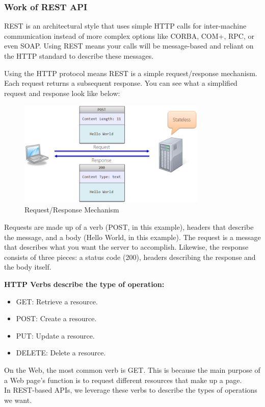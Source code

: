 \subsubsection{Work of REST API}
\hspace{2cm}REST is an architectural style that uses simple HTTP calls for inter-machine communication instead of more complex options like CORBA, COM+, RPC, or even SOAP. Using REST means your calls will be message-based and reliant on the HTTP standard to describe these messages.

Using the HTTP protocol means REST is a simple request/response mechanism. Each request returns a subsequent response. You can see what a simplified request and response look like below:
\newpage
\begin{figure}[htp]%
    \center%
    \includegraphics[width=0.8\textwidth]{images/ch4/REST-01.png}%
    \caption[Request/Response Mechanism]{Request/Response Mechanism}\label{fig: Request/Response Mechanism}%
  \end{figure}
  \newline
Requests are made up of a verb (POST, in this example), headers that describe the message, and a body (Hello World,  in this example). The request is a message that describes what you want the server to accomplish. Likewise, the response consists of three pieces: a status code (200), headers describing the response and the body itself.\newline

\textbf{HTTP Verbs describe the type of operation:}
\begin{itemize}
    \item GET: Retrieve a resource.
    \item POST: Create a resource.
    \item PUT: Update a resource.
    \item DELETE: Delete a resource.
\end{itemize}
On the Web, the most common verb is GET. This is because the main purpose of a Web page's function is to request different resources that make up a page.\\
In REST-based APIs, we leverage these verbs to describe the types of operations we want.

